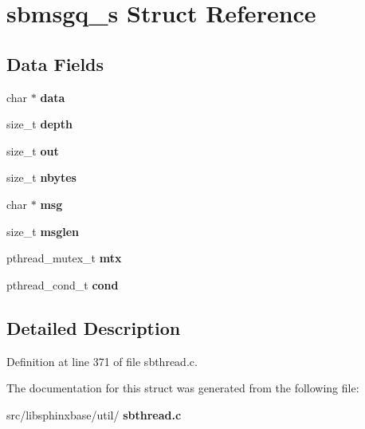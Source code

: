 \section{sbmsgq\+\_\+s Struct Reference}
\label{structsbmsgq__s}
\subsection*{Data Fields}
\begin{DoxyCompactItemize}
\item 
\mbox{\label{structsbmsgq__s_a8c0c9fa562dd4eec79802138e577d740}} 
char $\ast$ {\bfseries data}
\item 
\mbox{\label{structsbmsgq__s_aba30e2b57423a93000697814347fa530}} 
size\+\_\+t {\bfseries depth}
\item 
\mbox{\label{structsbmsgq__s_ad76947f213b9515762531e5b06e3fa91}} 
size\+\_\+t {\bfseries out}
\item 
\mbox{\label{structsbmsgq__s_a508c0e1d394985a4fd6ef2861b51f8b5}} 
size\+\_\+t {\bfseries nbytes}
\item 
\mbox{\label{structsbmsgq__s_a5a6b7b8d10dc431ce44cd7a7d2a1aca8}} 
char $\ast$ {\bfseries msg}
\item 
\mbox{\label{structsbmsgq__s_a4ee19f99df3ba79d54e3ccd19036a88b}} 
size\+\_\+t {\bfseries msglen}
\item 
\mbox{\label{structsbmsgq__s_a1a155e1f090870574f095bfe9801ef2f}} 
pthread\+\_\+mutex\+\_\+t {\bfseries mtx}
\item 
\mbox{\label{structsbmsgq__s_aa7380302e04ef8765f47f1e224ab9f27}} 
pthread\+\_\+cond\+\_\+t {\bfseries cond}
\end{DoxyCompactItemize}


\subsection{Detailed Description}


Definition at line 371 of file sbthread.\+c.



The documentation for this struct was generated from the following file\+:\begin{DoxyCompactItemize}
\item 
src/libsphinxbase/util/\textbf{ sbthread.\+c}\end{DoxyCompactItemize}
